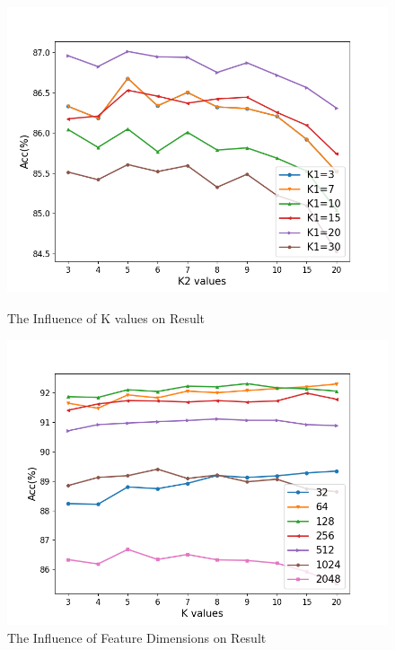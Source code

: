     \begin{figure}
        \centering
        \begin{minipage}[t]{0.48\linewidth}
            \centering
            \includegraphics[width=1.0\linewidth]{img/LFDA_K.png}
            \caption{The Influence of K values on Result}
            \label{fig:lfda_k}
        \end{minipage}
        \begin{minipage}[t]{0.48\linewidth}
            \centering
            \includegraphics[width=1.0\linewidth]{img/LFDA_res.png}
            \caption{The Influence of Feature Dimensions on Result}
            \label{fig:lfda_res}
        \end{minipage}
    \end{figure}
    
